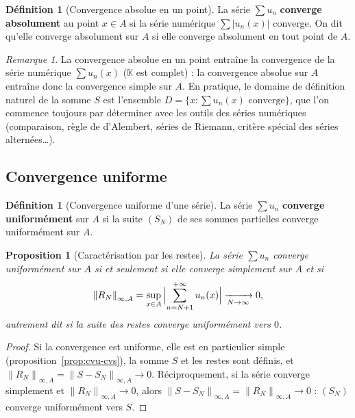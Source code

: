 \documentclass[11pt,a4paper]{article}
\theoremstyle{plain}
\newtheorem{proposition}[theoreme]{Proposition}
\theoremstyle{definition}
\newtheorem{definition}[theoreme]{Définition}
\theoremstyle{remark}
\newtheorem{remarque}[theoreme]{Remarque}
\newcommand{\K}{\mathbb{K}}
\newcommand{\Ninf}[2]{\left\lVert #1 \right\rVert_{\infty,#2}}
\numberwithin{equation}{section}
\begin{document}
\begin{definition}[Convergence absolue en un point]
La série $\sum u_n$ \textbf{converge absolument} au point $x\in A$ si la
série numérique $\sum \lvert u_n(x)\rvert$ converge. On dit qu'elle
converge absolument sur $A$ si elle converge absolument en tout point de
$A$.
\end{definition}

\begin{remarque}
La convergence absolue en un point entraîne la convergence de la série
numérique $\sum u_n(x)$ ($\K$ est complet) : la convergence absolue sur
$A$ entraîne donc la convergence simple sur $A$. En pratique, le domaine
de définition naturel de la somme $S$ est l'ensemble
$D=\{x : \sum u_n(x) \text{ converge}\}$, que l'on commence toujours par
déterminer avec les outils des séries numériques (comparaison, règle de
d'Alembert, séries de Riemann, critère spécial des séries alternées\ldots).
\end{remarque}

\subsection{Convergence uniforme}

\begin{definition}[Convergence uniforme d'une série]
La série $\sum u_n$ \textbf{converge uniformément} sur $A$ si la suite
$(S_N)$ de ses sommes partielles converge uniformément sur $A$.
\end{definition}

\begin{proposition}[Caractérisation par les restes]\label{prop:restes}
La série $\sum u_n$ converge uniformément sur $A$ si et seulement si elle
converge simplement sur $A$ et si
\[
    \Ninf{R_N}{A} = \sup_{x\in A}\,\Bigl\lvert \sum_{n=N+1}^{+\infty}
    u_n(x)\Bigr\rvert \xrightarrow[N\to\infty]{} 0 ,
\]
autrement dit si la suite des restes converge uniformément vers $0$.
\end{proposition}

\begin{proof}
Si la convergence est uniforme, elle est en particulier simple
(proposition~\ref{prop:cvu-cvs}), la somme $S$ et les restes sont définis,
et $\Ninf{R_N}{A} = \Ninf{S-S_N}{A} \to 0$. Réciproquement, si la série
converge simplement et $\Ninf{R_N}{A}\to 0$, alors
$\Ninf{S-S_N}{A} = \Ninf{R_N}{A}\to 0$ : $(S_N)$ converge uniformément
vers $S$.
\end{proof}
\end{document}
